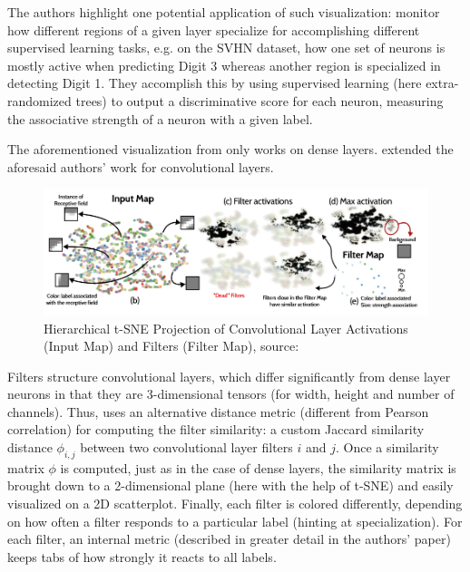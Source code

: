 \vspace{0.2cm}

The authors highlight one potential application of such visualization: monitor how different regions of a given layer specialize for accomplishing different supervised learning tasks, e.g. on the SVHN dataset, how one set of neurons is mostly active when predicting Digit 3 whereas another region is specialized in detecting Digit 1. They accomplish this by using supervised learning (here extra-randomized trees) to output a discriminative score for each neuron, measuring the associative strength of a neuron with a given label.

The aforementioned visualization from \cite{Rauber2017VisualizingTH} only works on dense layers. \cite{Pezzotti2018DeepEyesPV} extended the aforesaid authors' work for convolutional layers.


\vspace{0.2cm}

\begin{figure}[H]
	\centering
	\includegraphics[scale=0.85]{images/embedding_view/HRV_Fig_010_Dead_Zones.PNG}
	\caption{Hierarchical t-SNE Projection of Convolutional Layer Activations (Input Map) and Filters (Filter Map), source: \cite{Pezzotti2018DeepEyesPV}}
	\label{fig:HRV_010_Dead_Zones}
\end{figure}


\vspace{0.2cm}

Filters structure convolutional layers, which differ significantly from dense layer neurons in that they are 3-dimensional tensors (for width, height and number of channels). Thus, \cite{Pezzotti2018DeepEyesPV} uses an alternative distance metric (different from Pearson correlation) for computing the filter similarity: a custom Jaccard similarity distance $\phi_{i,j}$ between two convolutional layer filters $i$ and $j$. Once a similarity matrix $\phi$ is computed, just as in the case of dense layers, the similarity matrix is brought down to a 2-dimensional plane (here with the help of t-SNE) and easily visualized on a 2D scatterplot. Finally, each filter is colored differently, depending on how often a filter responds to a particular label (hinting at specialization). For each filter, an internal metric (described in greater detail in the authors' paper) keeps tabs of how strongly it reacts to all labels.


